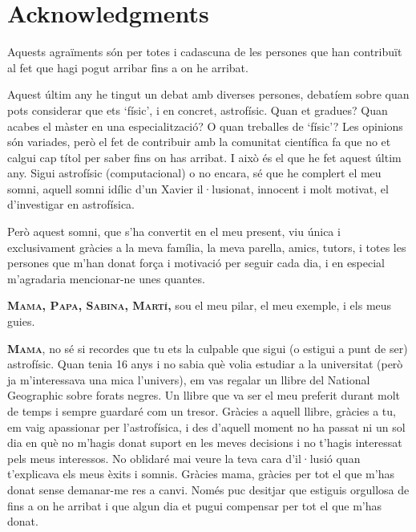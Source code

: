 \chapter*{\textbf{Acknowledgments}}
{}

Aquests agraïments són per totes i cadascuna de les persones que han contribuït al fet que hagi pogut arribar fins a on he arribat. 

Aquest últim any he tingut un debat amb diverses persones, debatíem sobre quan pots considerar que ets `físic', i en concret, astrofísic. Quan et gradues? Quan acabes el màster en una especialització? O quan treballes de `físic'? Les opinions són variades, però el fet de contribuir amb la comunitat científica fa que no et calgui cap títol per saber fins on has arribat. I això és el que he fet aquest últim any. Sigui astrofísic (computacional) o no encara, sé que he complert el meu somni, aquell somni idílic d'un Xavier il·lusionat, innocent i molt motivat, el d'investigar en astrofísica.

Però aquest somni, que s'ha convertit en el meu present, viu única i exclusivament gràcies a la meva família, la meva parella, amics, tutors, i totes les persones que m'han donat força i motivació per seguir cada dia, i en especial m'agradaria mencionar-ne unes quantes. 


\textsc{\textbf{Mama, Papa, Sabina, Martí,}} sou el meu pilar, el meu exemple, i els meus guies. 

\textsc{\textbf{Mama}}, no sé si recordes que tu ets la culpable que sigui (o estigui a punt de ser) astrofísic. Quan tenia 16 anys i no sabia què volia estudiar a la universitat (però ja m'interessava una mica l'univers), em vas regalar un llibre del National Geographic sobre forats negres. Un llibre que va ser el meu preferit durant molt de temps i sempre guardaré com un tresor. Gràcies a aquell llibre, gràcies a tu, em vaig apassionar per l'astrofísica, i des d'aquell moment no ha passat ni un sol dia en què no m'hagis donat suport en les meves decisions i no t'hagis interessat pels meus interessos. No oblidaré mai veure la teva cara d'il·lusió quan t'explicava els meus èxits i somnis. Gràcies mama, gràcies per tot el que m'has donat sense demanar-me res a canvi. Només puc desitjar que estiguis orgullosa de fins a on he arribat i que algun dia et pugui compensar per tot el que m'has donat.


